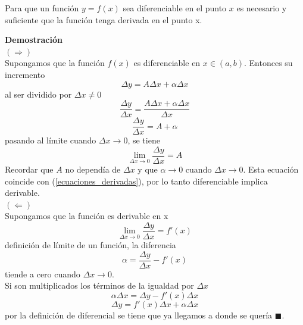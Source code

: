 \documentclass[10pt,twoside]{SelfArx} %
\begin{document}
\begin{teorema}
	Para que un función $ y=f(x) $ sea diferenciable en el punto $ x $ es necesario y suficiente que la función tenga derivada en el punto x.
\end{teorema}
\textbf{  Demostraci\'on}\\
$ (\Rightarrow) $\\
Supongamos que la funci\'on $ f(x) $ es diferenciable en $ x\in(a,b) $. Entonces su incremento 
\[  	\Delta y=A\Delta x+\alpha\Delta x  \]
al ser dividido por $ \Delta x\neq0 $
\begin{equation}
	\dfrac{\Delta y}{\Delta x}=\dfrac{A\Delta x+\alpha\Delta x}{\Delta x}
\end{equation}
\begin{equation}
\dfrac{\Delta y}{\Delta x}=A+\alpha
\end{equation}
pasando al límite cuando $ \Delta x\rightarrow0 $, se tiene
\begin{equation}
\lim\limits_{\Delta x\rightarrow0}\dfrac{\Delta y}{\Delta x}=A
\end{equation}
Recordar que $ A $ no dependía de $ \Delta x $ y que $ \alpha\rightarrow0 $ cuando $ \Delta x\rightarrow0 $. Esta ecuación coincide con (\ref{ecuaciones_derivadas}), por lo tanto diferenciable implica derivable.\\
$ (\Leftarrow) $\\
  Supongamos que la función es derivable en x
\begin{equation}
  \lim\limits_{\Delta x\rightarrow0}\dfrac{\Delta y}{\Delta x}=f'(x)
\end{equation}
 definici\'on de l\'imite de un funci\'on, la diferencia
 \begin{equation}
 \alpha=\dfrac{\Delta y}{\Delta x}-f'(x)
 \end{equation}  
 tiende a cero cuando $ \Delta x\rightarrow0 $.\\
 Si son multiplicados los t\'erminos de la igualdad por $ \Delta x $
 \begin{equation}
 \alpha\Delta x=\Delta y-f'(x)\Delta x
 \end{equation}
  \begin{equation}
  \Delta y=f'(x)\Delta x+\alpha\Delta x
  \end{equation}
  por la definici\'on de diferencial se tiene que ya llegamos a donde se quer\'ia $ \blacksquare $.\\
  
\end{document}
